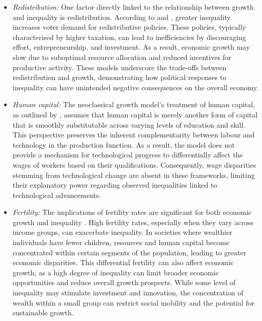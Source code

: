 \begin{itemize}
    \item \textit{Redistribution:} One factor directly linked to the relationship between growth and inequality is redistribution. According to \textcite{alesina1994distributive} and \textcite{NBERw5658}, greater inequality increases voter demand for redistributive policies. These policies, typically characterised by higher taxation, can lead to inefficiencies by discouraging effort, entrepreneurship, and investment. As a result, economic growth may slow due to suboptimal resource allocation and reduced incentives for productive activity. These models underscore the trade-offs between redistribution and growth, demonstrating how political responses to inequality can have unintended negative consequences on the overall economy.
    \item \textit{Human capital:} The neoclassical growth model's treatment of human capital, as outlined by \textcite{Becker1993, Schultz1960}, assumes that human capital is merely another form of capital that is smoothly substitutable across varying levels of education and skill. This perspective preserves the inherent complementarity between labour and technology in the production function. As a result, the model does not provide a mechanism for technological progress to differentially affect the wages of workers based on their qualifications. Consequently, wage disparities stemming from technological change are absent in these frameworks, limiting their explanatory power regarding observed inequalities linked to technological advancements.
    \item \textit{Fertility:} The implications of fertility rates are significant for both economic growth and inequality \parencite{de2003inequality}. High fertility rates, especially when they vary across income groups, can exacerbate inequality. In societies where wealthier individuals have fewer children, resources and human capital become concentrated within certain segments of the population, leading to greater economic disparities. This differential fertility can also affect economic growth, as a high degree of inequality can limit broader economic opportunities and reduce overall growth prospects. While some level of inequality may stimulate investment and innovation, the concentration of wealth within a small group can restrict social mobility and the potential for sustainable growth.

\end{itemize}
